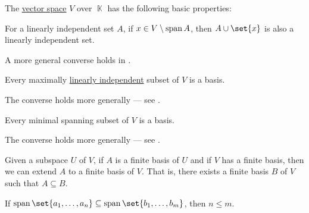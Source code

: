 \begin{proposition}\label{thm:def:vector_space}
  The \hyperref[def:vector_space]{vector space} \( V \) over \( \BbbK \) has the following basic properties:
  \begin{thmenum}
     For a linearly independent set \( A \), if \( x \in V \setminus \operatorname{span} A \), then \( A \cup \set{ x } \) is also a linearly independent set.

    A more general converse holds in .

     Every maximally \hyperref[thm:def:linear_dependence]{linearly independent} subset of \( V \) is a basis.

    The converse holds more generally --- see .

     Every minimal spanning subset of \( V \) is a basis.

    The converse holds more generally --- see .

     Given a subspace \( U \) of \( V \), if \( A \) is a finite basis of \( U \) and if \( V \) has a finite basis, then we can extend \( A \) to a finite basis of \( V \). That is, there exists a finite basis \( B \) of \( V \) such that \( A \subseteq B \).

     If \( \linspan\set{ a_1, \ldots, a_n } \subseteq \linspan\set{ b_1, \ldots, b_m } \), then \( n \leq m \).
  \end{thmenum}
\end{proposition}
